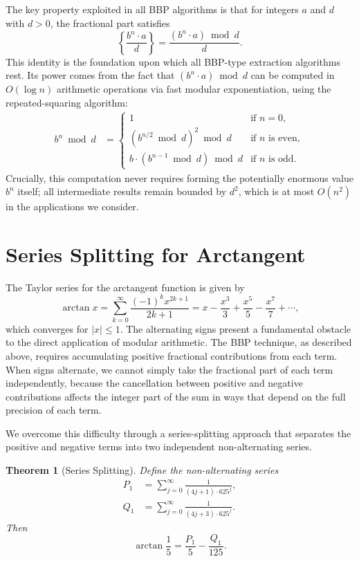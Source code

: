 \documentclass[11pt]{article}
\newtheorem{theorem}{Theorem}[section]
\begin{document}
The key property exploited in all BBP algorithms is that for integers $a$ and $d$ with $d > 0$, the fractional part satisfies
\begin{equation}\label{eq:mod-frac}
\left\{ \frac{b^n \cdot a}{d} \right\} = \frac{(b^n \cdot a) \bmod d}{d}.
\end{equation}
This identity is the foundation upon which all BBP-type extraction algorithms rest. Its power comes from the fact that $(b^n \cdot a) \bmod d$ can be computed in $O(\log n)$ arithmetic operations via fast modular exponentiation, using the repeated-squaring algorithm:
\begin{align*}
b^n \bmod d &= \begin{cases}
1 & \text{if } n = 0, \\
(b^{n/2} \bmod d)^2 \bmod d & \text{if } n \text{ is even}, \\
b \cdot (b^{n-1} \bmod d) \bmod d & \text{if } n \text{ is odd}.
\end{cases}
\end{align*}
Crucially, this computation never requires forming the potentially enormous value $b^n$ itself; all intermediate results remain bounded by $d^2$, which is at most $O(n^2)$ in the applications we consider.

\section{Series Splitting for Arctangent}

The Taylor series for the arctangent function is given by
\[
\arctan x = \sum_{k=0}^{\infty} \frac{(-1)^k x^{2k+1}}{2k+1} = x - \frac{x^3}{3} + \frac{x^5}{5} - \frac{x^7}{7} + \cdots,
\]
which converges for $|x| \leq 1$. The alternating signs present a fundamental obstacle to the direct application of modular arithmetic. The BBP technique, as described above, requires accumulating positive fractional contributions from each term. When signs alternate, we cannot simply take the fractional part of each term independently, because the cancellation between positive and negative contributions affects the integer part of the sum in ways that depend on the full precision of each term.

We overcome this difficulty through a series-splitting approach that separates the positive and negative terms into two independent non-alternating series.

\begin{theorem}[Series Splitting]\label{thm:split}
Define the non-alternating series
\begin{align}
P_1 &= \sum_{j=0}^{\infty} \frac{1}{(4j+1) \cdot 625^j}, \label{eq:P1}\\
Q_1 &= \sum_{j=0}^{\infty} \frac{1}{(4j+3) \cdot 625^j}. \label{eq:Q1}
\end{align}
Then
\begin{equation}\label{eq:arctan-split}
\arctan\frac{1}{5} = \frac{P_1}{5} - \frac{Q_1}{125}.
\end{equation}
\end{theorem}
\end{document}
